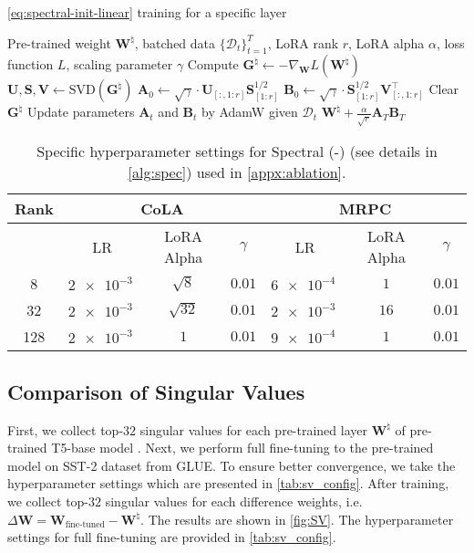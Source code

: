 \begin{algorithm}[!h]
\caption{\eqref{eq:spectral-init-linear} training for a specific layer}
\label{alg:spec}
\begin{algorithmic}[1]
\Input Pre-trained weight $\bm W^\natural$, batched data $\{\mathcal{D}_t\}_{t=1}^{T}$, LoRA rank $r$, LoRA alpha $\alpha$, loss function $L$, scaling parameter $\gamma$
\Initialize
\STATE Compute $\bm G^\natural \gets -\nabla_{\bm W} L(\bm W^\natural)$
\STATE $\bm U, \bm S, \bm V \gets \text{SVD}\left(\bm G^\natural\right)$
\STATE $\bm A_0 \gets \sqrt{\gamma}\cdot\bm U_{[:,1:r]}\bm S^{1/2}_{[1:r]}$
\STATE $\bm B_0 \gets \sqrt{\gamma}\cdot \bm S^{1/2}_{[1:r]}\bm V^{\!\top}_{[:,1:r]}$
\STATE Clear $\bm G^\natural$
\Train
{}
\STATE Update parameters $\bm A_t$ and $\bm B_t$ by AdamW given $\mathcal{D}_t$
\ENDFOR
\Return $\bm W^\natural + \frac{\alpha}{\sqrt{r}} \bm A_{T} \bm B_{T}$
\end{algorithmic}
\end{algorithm}

\begin{table}[h!]
    \centering
    \caption{Specific hyperparameter settings for Spectral (-) (see details in \cref{alg:spec}) used in \cref{appx:ablation}.}
    \begin{tabular}{cccc|ccc}
    \toprule
        Rank & \multicolumn{3}{c|}{CoLA} & \multicolumn{3}{c}{MRPC} \\
        \midrule
         & LR & LoRA Alpha & $\gamma$ & LR & LoRA Alpha & $\gamma$ \\
         \midrule
        8 & $\SI{2e-3}{}$ & $\sqrt{8}$ & $0.01$ & $\SI{6e-4}{}$ & $1$ & $0.01$ \\
        32 & $\SI{2e-3}{}$ & $\sqrt{32}$ & $0.01$ & $\SI{2e-3}{}$ & $16$ & $0.01$  \\
        128 & $\SI{2e-3}{}$ & $1$ & $0.01$  & $\SI{9e-4}{}$ & $1$ & $0.01$  \\
        \bottomrule
    \end{tabular}
    \label{tab:spec-hyp}
\end{table}


\subsection{Comparison of Singular Values}
\label{SV-figs}
First, we collect top-$32$ singular values for each pre-trained layer $\mathbf{W}^\natural$ of pre-trained T5-base model \citep{raffel2020exploring}. Next, we perform full fine-tuning to the pre-trained model on SST-2 dataset from GLUE. To ensure better convergence, we take the hyperparameter settings which are presented in \cref{tab:sv_config}. After training, we collect top-$32$ singular values for each difference weights, i.e. $\Delta \mathbf{W} = \mathbf{W}_\text{fine-tuned} - \mathbf{W}^\natural$. The results are shown in \cref{fig:SV}. The hyperparameter settings for full fine-tuning are provided in \cref{tab:sv_config}.

